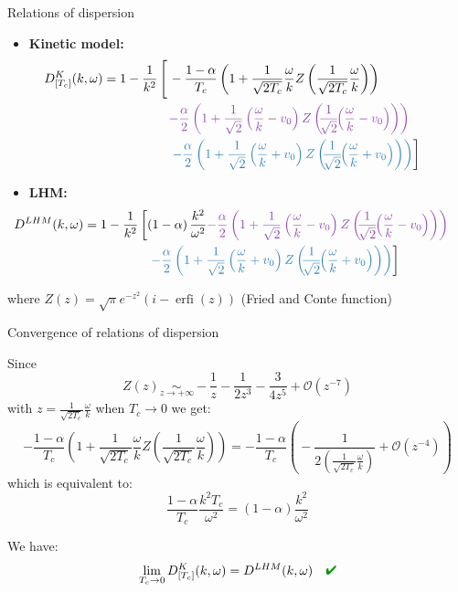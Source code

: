 \documentclass{beamer}
\newcommand{\cmark}{{\color{dgreen}\ding{52}}}
\newcommand{\mbold}[1]{{\textbf{\color{PLB}#1}}}
\DeclareMathOperator\erfi{erfi}
\begin{document}
\begin{frame}{Relations of dispersion}
  \begin{itemize}
    \item \mbold{Kinetic model:}$$\begin{aligned}
    \!\!\!\!\!\!\!\!\!\!\!\!\!\!\!D^K_{[T_c]}(k,\omega) = 1 - \frac{1}{k^2}\left[\vphantom{\frac{}{\sqrt{}}}\right. & -\frac{1-\alpha}{T_c}\left( 1 + \frac{1}{\sqrt{2T_c}}\frac{\omega}{k}Z\left( \frac{1}{\sqrt{2T_c}}\frac{\omega}{k}\right) \right) \\
                                          & {\color{violet}-\frac{\alpha}{2}\left( 1 + \frac{1}{\sqrt{2}}\left(\frac{\omega}{k}-v_0\right)Z\left(\!\!\frac{1}{\sqrt{2}}\!\!\left(\frac{\omega}{k}-v_0\right)\right) \right)} \\
                                          & \left. {\color{bleu}-\frac{\alpha}{2}\left( 1 + \frac{1}{\sqrt{2}}\left(\frac{\omega}{k}+v_0\right)Z\left(\!\!\frac{1}{\sqrt{2}}\!\!\left(\frac{\omega}{k}+v_0\right)\right) \right)}  \right]
  \end{aligned}$$
  \item \mbold{LHM:}$$
  \begin{aligned}
      \!\!\!\!\!\!\!\!\!\!\!\!\!\!\!D^{LHM}(k,\omega)
    &=1-\frac{1}{k^2}\left[\left(1-\alpha\right)\frac{k^2}{\omega^2}{\color{violet}-\frac{\alpha}{2}\left(1+\frac{1}{\sqrt{2}}\left(\frac{\omega}{k}-v_0\right)Z\left(\!\!\frac{1}{\sqrt{2}}\!\!\left(\frac{\omega}{k}-v_0\right)\right)\right)}\right.\nonumber\\
    &~~~~~~~~~~~~~~~\left.{\color{bleu}-\frac{\alpha}{2}\left(1+\frac{1}{\sqrt{2}}\left(\frac{\omega}{k}+v_0\right)Z\left(\!\!\frac{1}{\sqrt{2}}\!\!\left(\frac{\omega}{k}+v_0\right)\right)\right)}\right]
  \end{aligned}
  $$
  \end{itemize}
  where $Z(z) = \sqrt{\pi}e^{-z^2}(i-\erfi(z))$ (Fried and Conte function)
\end{frame}

\begin{frame}{Convergence of relations of dispersion}

  Since $$Z(z) \underset{z\to+\infty}{\sim} -\frac{1}{z} - \frac{1}{2z^3} - \frac{3}{4z^5} + \mathcal{O}(z^{-7})$$
  with $z = \frac{1}{\sqrt{2T_c}}\frac{\omega}{k}$ when $T_c\to 0$ we get:
  $$
    -\frac{1-\alpha}{T_c}\left(\!1+\frac{1}{\sqrt{2T_c}}\frac{\omega}{k}Z\left(\frac{1}{\sqrt{2T_c}}\frac{\omega}{k}\right)\!\right)
    =
    -\frac{1-\alpha}{T_c}\left(\!- \frac{1}{2\left(\frac{1}{\sqrt{2T_c}}\frac{\omega}{k}\right)} + \mathcal{O}(z^{-4})\!\right)
  $$
  which is equivalent to:
  $$
    \frac{1-\alpha}{T_c}\frac{k^2T_c}{\omega^2} = (1-\alpha)\frac{k^2}{\omega^2}
  $$

  We have: $$\lim_{T_c\to 0}D^K_{[T_c]}(k,\omega) = D^{LHM}(k,\omega)\quad\text{\cmark}$$
\end{frame}
\end{document}
